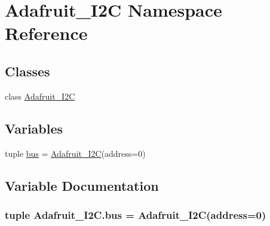 \hypertarget{namespaceAdafruit__I2C}{}\section{Adafruit\+\_\+\+I2\+C Namespace Reference}
\label{namespaceAdafruit__I2C}
\subsection*{Classes}
\begin{DoxyCompactItemize}
\item 
class \hyperlink{classAdafruit__I2C_1_1Adafruit__I2C}{Adafruit\+\_\+\+I2\+C}
\end{DoxyCompactItemize}
\subsection*{Variables}
\begin{DoxyCompactItemize}
\item 
tuple \hyperlink{namespaceAdafruit__I2C_af1d4a6272f147c8d4f090961cbc387b6}{bus} = \hyperlink{classAdafruit__I2C_1_1Adafruit__I2C}{Adafruit\+\_\+\+I2\+C}(address=0)
\end{DoxyCompactItemize}


\subsection{Variable Documentation}
\hypertarget{namespaceAdafruit__I2C_af1d4a6272f147c8d4f090961cbc387b6}{}
\subsubsection[{bus}]{\setlength{\rightskip}{0pt plus 5cm}tuple Adafruit\+\_\+\+I2\+C.\+bus = {\bf Adafruit\+\_\+\+I2\+C}(address=0)}\label{namespaceAdafruit__I2C_af1d4a6272f147c8d4f090961cbc387b6}
